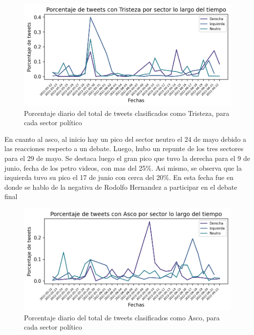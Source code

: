 \begin{figure}[t]
	\centering
	\includegraphics{Images & Logos/Results/Porcentaje de tweets con Tristeza por sector lo largo del tiempo.png} 
	\caption{Porcentaje diario del total de tweets clasificados como Tristeza, para cada sector político}
	\label{figure:tweets_percent_Tristeza_tiempo}
\end{figure}

En cuanto al asco, al inicio hay un pico del sector neutro el 24 de mayo debido a las reacciones respecto a un debate. Luego, hubo un repunte de los tres sectores para el 29 de mayo. Se destaca luego el gran pico que tuvo la derecha para el 9 de junio, fecha de los petro videos, con mas del 25\%. Asi mismo, se observa que la izquierda tuvo su pico el 17 de junio con cerca del 20\%. En esta fecha fue en donde se hablo de la negativa de Rodolfo Hernandez a participar en el debate final

\begin{figure}[t]
	\centering
	\includegraphics{Images & Logos/Results/Porcentaje de tweets con Asco por sector lo largo del tiempo.png} 
	\caption{Porcentaje diario del total de tweets clasificados como Asco, para cada sector político}
	\label{figure:tweets_percent_Asco_tiempo}
\end{figure}














